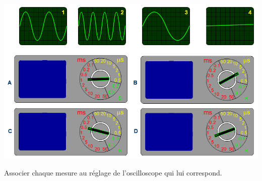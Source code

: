 \documentclass[a4paper,11pt]{exam}
\begin{document}
\begin{center}
	\includegraphics[scale=0.6]{img/oscillos2}
\end{center}

\begin{questions}
	\question Associer chaque mesure au réglage de l'oscilloscope qui lui correspond.\fillwithdottedlines{2cm}
\end{questions}


\ \label{LastPage}
\end{document}
